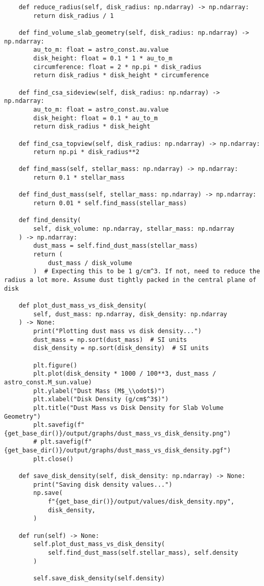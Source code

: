 \begin{lstlisting}
    def reduce_radius(self, disk_radius: np.ndarray) -> np.ndarray:
        return disk_radius / 1

    def find_volume_slab_geometry(self, disk_radius: np.ndarray) -> np.ndarray:
        au_to_m: float = astro_const.au.value
        disk_height: float = 0.1 * 1 * au_to_m
        circumference: float = 2 * np.pi * disk_radius
        return disk_radius * disk_height * circumference

    def find_csa_sideview(self, disk_radius: np.ndarray) -> np.ndarray:
        au_to_m: float = astro_const.au.value
        disk_height: float = 0.1 * au_to_m
        return disk_radius * disk_height

    def find_csa_topview(self, disk_radius: np.ndarray) -> np.ndarray:
        return np.pi * disk_radius**2

    def find_mass(self, stellar_mass: np.ndarray) -> np.ndarray:
        return 0.1 * stellar_mass

    def find_dust_mass(self, stellar_mass: np.ndarray) -> np.ndarray:
        return 0.01 * self.find_mass(stellar_mass)

    def find_density(
        self, disk_volume: np.ndarray, stellar_mass: np.ndarray
    ) -> np.ndarray:
        dust_mass = self.find_dust_mass(stellar_mass)
        return (
            dust_mass / disk_volume
        )  # Expecting this to be 1 g/cm^3. If not, need to reduce the radius a lot more. Assume dust tightly packed in the central plane of disk

    def plot_dust_mass_vs_disk_density(
        self, dust_mass: np.ndarray, disk_density: np.ndarray
    ) -> None:
        print("Plotting dust mass vs disk density...")
        dust_mass = np.sort(dust_mass)  # SI units
        disk_density = np.sort(disk_density)  # SI units

        plt.figure()
        plt.plot(disk_density * 1000 / 100**3, dust_mass / astro_const.M_sun.value)
        plt.ylabel("Dust Mass (M$_\\odot$)")
        plt.xlabel("Disk Density (g/cm$^3$)")
        plt.title("Dust Mass vs Disk Density for Slab Volume Geometry")
        plt.savefig(f"{get_base_dir()}/output/graphs/dust_mass_vs_disk_density.png")
        # plt.savefig(f"{get_base_dir()}/output/graphs/dust_mass_vs_disk_density.pgf")
        plt.close()

    def save_disk_density(self, disk_density: np.ndarray) -> None:
        print("Saving disk density values...")
        np.save(
            f"{get_base_dir()}/output/values/disk_density.npy",
            disk_density,
        )

    def run(self) -> None:
        self.plot_dust_mass_vs_disk_density(
            self.find_dust_mass(self.stellar_mass), self.density
        )

        self.save_disk_density(self.density)
\end{lstlisting}